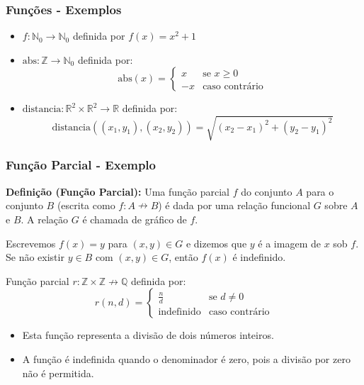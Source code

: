 \begin{frame}
  \frametitle{Funções - Exemplos}

  \begin{itemize}
    \item \( f : \mathbb{N}_0 \rightarrow \mathbb{N}_0 \) definida por \( f(x) = x^2 + 1 \)
    
    \item \( \text{abs} : \mathbb{Z} \rightarrow \mathbb{N}_0 \) definida por:
    \[
    \text{abs}(x) = 
    \begin{cases} 
      x & \text{se } x \geq 0 \\
      -x & \text{caso contrário}
    \end{cases}
    \]
    
    \item \( \text{distancia} : \mathbb{R}^2 \times \mathbb{R}^2 \rightarrow \mathbb{R} \) definida por:
    \[
    \text{distancia}((x_1, y_1),(x_2, y_2)) = \sqrt{(x_2 - x_1)^2 + (y_2 - y_1)^2}
    \]
  \end{itemize}

\end{frame}

\begin{frame}
  \frametitle{Função Parcial - Exemplo}

  \textbf{Definição (Função Parcial):}
  Uma função parcial \( f \) do conjunto \( A \) para o conjunto \( B \) (escrita como \( f : A \nrightarrow B \)) é dada por uma relação funcional \( G \) sobre \( A \) e \( B \). A relação \( G \) é chamada de gráfico de \( f \).

  \vspace{0.5cm}

  Escrevemos \( f(x) = y \) para \( (x, y) \in G \) e dizemos que \( y \) é a imagem de \( x \) sob \( f \). Se não existir \( y \in B \) com \( (x, y) \in G \), então \( f(x) \) é indefinido.

  Função parcial \( r : \mathbb{Z} \times \mathbb{Z} \nrightarrow \mathbb{Q} \) definida por:
  \[
  r(n, d) = 
  \begin{cases} 
    \frac{n}{d} & \text{se } d \neq 0 \\
    \text{indefinido} & \text{caso contrário}
  \end{cases}
  \]

  \begin{itemize}
    \item Esta função representa a divisão de dois números inteiros.
    \item A função é indefinida quando o denominador é zero, pois a divisão por zero não é permitida.
  \end{itemize}

\end{frame}

